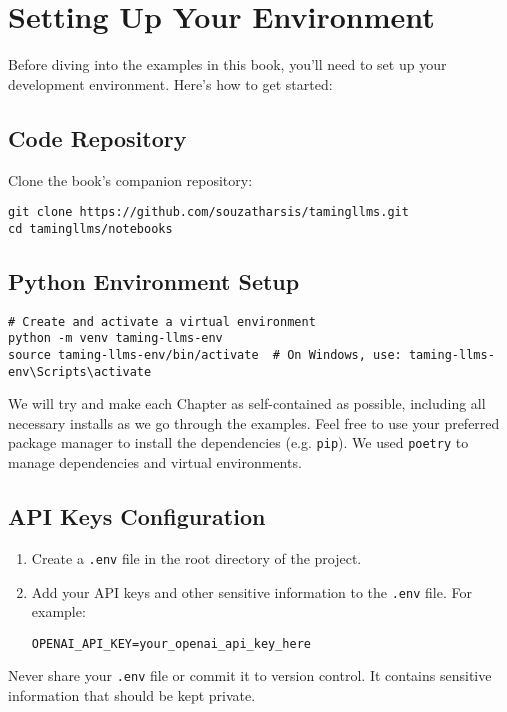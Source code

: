 \section{Setting Up Your Environment}

Before diving into the examples in this book, you'll need to set up your development environment. Here's how to get started:

\subsection{Code Repository}
Clone the book's companion repository:
\begin{verbatim}
git clone https://github.com/souzatharsis/tamingllms.git
cd tamingllms/notebooks
\end{verbatim}

\subsection{Python Environment Setup}
\begin{verbatim}
# Create and activate a virtual environment
python -m venv taming-llms-env
source taming-llms-env/bin/activate  # On Windows, use: taming-llms-env\Scripts\activate
\end{verbatim}
We will try and make each Chapter as self-contained as possible, including all necessary installs as we go through the examples.
Feel free to use your preferred package manager to install the dependencies (e.g. \texttt{pip}). We used \texttt{poetry} to manage dependencies and virtual environments.

\subsection{API Keys Configuration}
\begin{enumerate}
\item Create a \texttt{.env} file in the root directory of the project.
\item Add your API keys and other sensitive information to the \texttt{.env} file. For example:

\begin{verbatim}
OPENAI_API_KEY=your_openai_api_key_here
\end{verbatim}
\end{enumerate}

\begin{note}
Never share your \texttt{.env} file or commit it to version control. It contains sensitive information that should be kept private.
\end{note}

